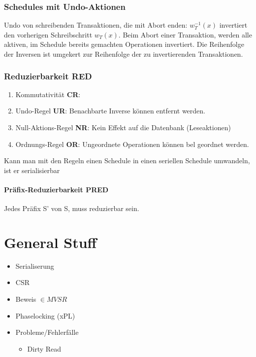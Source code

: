\documentclass[ngerman]{scrartcl}
\begin{document}
\subsubsection{Schedules mit Undo-Aktionen}
Undo von schreibenden Transaktionen, die mit Abort enden: $ w_T ^{-1} (x) $ invertiert den vorherigen Schreibschritt $ w_T(x) $. Beim Abort einer Transaktion, werden alle aktiven, im Schedule bereits gemachten Operationen invertiert. Die Reihenfolge der Inversen ist umgekert zur Reihenfolge der zu invertierenden Transaktionen.

\subsubsection{Reduzierbarkeit RED}  
\begin{enumerate}
  \item Kommutativität \textbf{CR}:
  \item Undo-Regel \textbf{UR}: Benachbarte Inverse können entfernt werden.
  \item Null-Aktions-Regel \textbf{NR}: Kein Effekt auf die Datenbank (Leseaktionen)
  \item Ordnungs-Regel \textbf{OR}: Ungeordnete Operationen können bel geordnet werden.
\end{enumerate}
Kann man mit den Regeln einen Schedule in einen seriellen Schedule umwandeln, ist er serialisierbar

\paragraph{Präfix-Reduzierbarkeit PRED} Jedes Präfix S' von S, muss reduzierbar sein.

 



%
%
%
%

\section{General Stuff}
\begin{itemize}
  \item Serialiserung
  \item CSR
  \item Beweis $ \in MVSR $
  \item Phaselocking (xPL)
  \item Probleme/Fehlerfälle
  \begin{itemize}
    \item Dirty Read
  \end{itemize}
\end{itemize}
\end{document}
